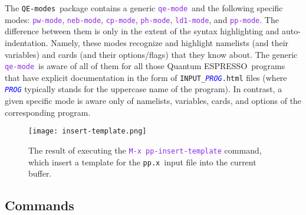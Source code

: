 \documentclass[12pt,a4paper]{article}
\def\qe{{\sc Quantum ESPRESSO}}
\def\ppx{\texttt{pp.x}}
\def\QEmodes{\texttt{QE-modes}}
\def\efn#1{\textcolor{BlueViolet}{\texttt{#1}}}
\def\var#1{\textcolor{Blue}{\texttt{\textit{#1}}}}
\def\qemode{\efn{qe-mode}}
\def\nebmode{\efn{neb-mode}}
\def\pwmode{\efn{pw-mode}}
\def\cpmode{\efn{cp-mode}}
\def\phmode{\efn{ph-mode}}
\def\ldmode{\efn{ld1-mode}}
\def\ppmode{\efn{pp-mode}}
\begin{document}
The \QEmodes\ package contains a generic \qemode\ and the following
specific modes: \pwmode, \nebmode, \cpmode, \phmode, \ldmode, and \ppmode.
The difference between them is only in the extent of the syntax
highlighting and auto-indentation. Namely, these modes recognize and
highlight namelists (and their variables) and cards (and their
options/flags) that they know about.
%
The generic \qemode\ is aware of all of them for all those \qe\
programs that have explicit documentation in the form of
\verb+INPUT_+\var{PROG}\verb+.html+ files (where \var{PROG}
typically stands for the uppercase name of the program). In contrast,
a given specific mode is aware only of namelists, variables, cards, and
options of the corresponding program.

\begin{figure}[htb]
  \centering
  \texttt{[image: insert-template.png]}
  \caption{The result of executing the \efn{M-x pp-insert-template}
    command, which insert a template for the \ppx\ input file into the
    current buffer.}
  \label{fig:insert-template}
\end{figure}
\subsection{Commands}
\end{document}
